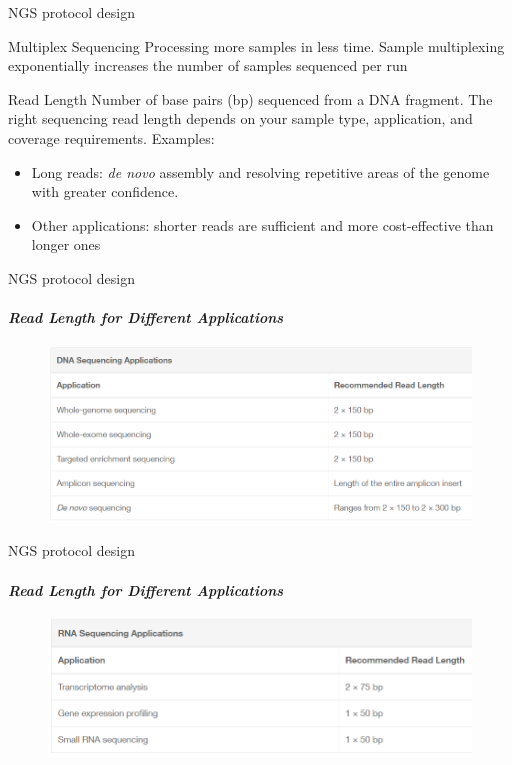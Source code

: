 \documentclass{if-beamer}
\begin{document}
\begin{frame}{NGS protocol design}
\begin{exampleblock}{Multiplex Sequencing}
Processing more samples in less time. Sample multiplexing exponentially increases the number of samples sequenced per run
\end{exampleblock}
\begin{exampleblock}{Read Length}
Number of base pairs (bp) sequenced from a DNA fragment. The right sequencing read length depends on your sample type, application, and coverage requirements.
Examples: 
\begin{itemize}
  \item Long reads: \textit{de novo} assembly and resolving repetitive areas of the genome with greater confidence.
  \item Other applications: shorter reads are sufficient and more cost-effective than longer ones
\end{itemize}
\end{exampleblock}
\end{frame}
\begin{frame}{NGS protocol design}
\framesubtitle{\emph{Read Length for Different Applications}}
\begin{figure}
\centering
\includegraphics[scale=0.4]{dna_sequencing_applications.PNG}
\end{figure}
\end{frame}
\begin{frame}{NGS protocol design}
\framesubtitle{\emph{Read Length for Different Applications}}
\begin{figure}
\centering
\includegraphics[scale=0.45]{rna_sequencing_applications.PNG}
\end{figure}
\end{frame}
\end{document}
